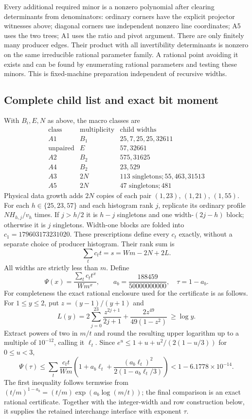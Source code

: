 Every additional required minor is a nonzero polynomial after clearing
determinants from denominators: ordinary corners have the explicit
projector witnesses above; diagonal corners use independent nonzero
line coordinates; A5 uses the two trees; A1 uses the ratio and pivot
argument. There are only finitely many producer edges. Their product
with all invertibility determinants is nonzero on the same irreducible
rational parameter family. A rational point avoiding it exists and can
be found by enumerating rational parameters and testing these minors.
This is fixed-machine preparation independent of recursive widths.

\subsection{Complete child list and exact bit moment}
With $B_i,E,N$ as above, the macro classes are
\[
\begin{array}{c|r|l}
 \text{class}&\text{multiplicity}&\text{child widths}\\\hline
 A1&B_1&25,7,25,25,32611\\
 \text{unpaired}&E&57,32661\\
 A2&B_2&575,31625\\
 A4&B_2&23,529\\
 A3&2N&113\text{ singletons};55,463,31513\\
 A5&2N&47\text{ singletons};481
\end{array}
\]
Physical data growth adds $2N$ copies of each pair $(1,23)$, $(1,21)$,
$(1,55)$. For each $h\in\{25,23,57\}$ and each histogram rank $j$,
replicate its ordinary profile $NH_{h,j}/v_h$ times. If $j>h/2$ it is
$h-j$ singletons and one width-$(2j-h)$ block; otherwise it is $j$
singletons. Width-one blocks are folded into
$c_1=179603173231020$. These prescriptions define every $c_t$ exactly,
without a separate choice of producer histogram. Their rank sum is
\[
 \sum_t c_tt=s=Wm-2N+2L.
\]
All widths are strictly less than $m$. Define
\[
 \Psi(x)=\frac{\sum_tc_tt^x}{Wm^x},\qquad
 a_b=\frac{188459}{50000000000},\quad \tau=1-a_b.
\]
For completeness the exact rational enclosure used for the certificate
is as follows. For $1\le y\le2$, put $z=(y-1)/(y+1)$ and
\[
 L(y)=2\sum_{j=0}^{23}\frac{z^{2j+1}}{2j+1}
       +\frac{2z^{49}}{49(1-z^2)}\ \ge\log y.
\]
Extract powers of two in $m/t$ and round the resulting upper logarithm
up to a multiple of $10^{-12}$, calling it $\ell_t$.
Since $e^u\le1+u+u^2/(2(1-u/3))$ for $0\le u<3$,
\[
 \Psi(\tau)\le\sum_t\frac{c_tt}{Wm}
 \left(1+a_b\ell_t+\frac{(a_b\ell_t)^2}{2(1-a_b\ell_t/3)}\right)
 <1-6.1778\times10^{-14}.
\]
The first inequality follows termwise from
$(t/m)^{1-a_b}=(t/m)\exp(a_b\log(m/t))$; the final comparison is an
exact rational certificate. Together with the integer-width and row
construction below, it supplies the retained interchange interface with
exponent $\tau$.

